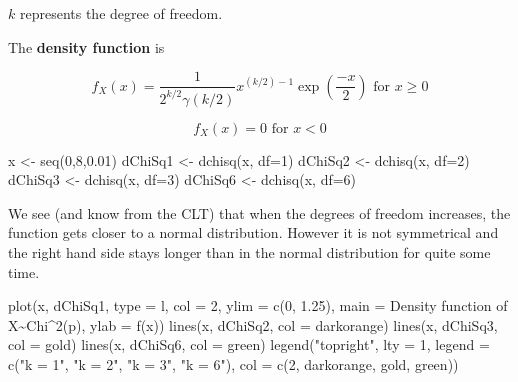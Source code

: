 \documentclass[
  letterpaper,
  DIV=11,
  numbers=noendperiod]{scrreprt}
\newenvironment{Shaded}{\begin{snugshade}}{\end{snugshade}}
\newcommand{\AttributeTok}[1]{\textcolor[rgb]{0.40,0.45,0.13}{#1}}
\newcommand{\DecValTok}[1]{\textcolor[rgb]{0.68,0.00,0.00}{#1}}
\newcommand{\FloatTok}[1]{\textcolor[rgb]{0.68,0.00,0.00}{#1}}
\newcommand{\FunctionTok}[1]{\textcolor[rgb]{0.28,0.35,0.67}{#1}}
\newcommand{\NormalTok}[1]{\textcolor[rgb]{0.00,0.23,0.31}{#1}}
\newcommand{\OtherTok}[1]{\textcolor[rgb]{0.00,0.23,0.31}{#1}}
\newcommand{\StringTok}[1]{\textcolor[rgb]{0.13,0.47,0.30}{#1}}
\begin{document}
\(k\) represents the degree of freedom.

The \textbf{density function} is

\[f_X(x) = \dfrac {1} {2^{k/2} \gamma(k/2)} x^{(k/2)-1} \exp{(\dfrac{-x}{2})} \text{ for } x \geq 0\]

\[f_X(x) = 0 \text{ for } x < 0\]

\begin{Shaded}
\begin{Highlighting}[]
\NormalTok{x }\OtherTok{\textless{}{-}} \FunctionTok{seq}\NormalTok{(}\DecValTok{0}\NormalTok{,}\DecValTok{8}\NormalTok{,}\FloatTok{0.01}\NormalTok{)}
\NormalTok{dChiSq1 }\OtherTok{\textless{}{-}} \FunctionTok{dchisq}\NormalTok{(x, }\AttributeTok{df=}\DecValTok{1}\NormalTok{)}
\NormalTok{dChiSq2 }\OtherTok{\textless{}{-}} \FunctionTok{dchisq}\NormalTok{(x, }\AttributeTok{df=}\DecValTok{2}\NormalTok{)}
\NormalTok{dChiSq3 }\OtherTok{\textless{}{-}} \FunctionTok{dchisq}\NormalTok{(x, }\AttributeTok{df=}\DecValTok{3}\NormalTok{)}
\NormalTok{dChiSq6 }\OtherTok{\textless{}{-}} \FunctionTok{dchisq}\NormalTok{(x, }\AttributeTok{df=}\DecValTok{6}\NormalTok{)}
\end{Highlighting}
\end{Shaded}

We see (and know from the CLT) that when the degrees of freedom
increases, the function gets closer to a normal distribution. However it
is not symmetrical and the right hand side stays longer than in the
normal distribution for quite some time.

\begin{Shaded}
\begin{Highlighting}[]
\FunctionTok{plot}\NormalTok{(x, dChiSq1, }\AttributeTok{type =} \StringTok{\textquotesingle{}l\textquotesingle{}}\NormalTok{, }\AttributeTok{col =} \DecValTok{2}\NormalTok{, }\AttributeTok{ylim =} \FunctionTok{c}\NormalTok{(}\DecValTok{0}\NormalTok{, }\FloatTok{1.25}\NormalTok{),}
     \AttributeTok{main =} \StringTok{\textquotesingle{}Density function of X\textasciitilde{}Chi\^{}2(p)\textquotesingle{}}\NormalTok{, }\AttributeTok{ylab =} \StringTok{\textquotesingle{}f(x)\textquotesingle{}}\NormalTok{)}
\FunctionTok{lines}\NormalTok{(x, dChiSq2, }\AttributeTok{col =} \StringTok{\textquotesingle{}darkorange\textquotesingle{}}\NormalTok{)}
\FunctionTok{lines}\NormalTok{(x, dChiSq3, }\AttributeTok{col =} \StringTok{\textquotesingle{}gold\textquotesingle{}}\NormalTok{)}
\FunctionTok{lines}\NormalTok{(x, dChiSq6, }\AttributeTok{col =} \StringTok{\textquotesingle{}green\textquotesingle{}}\NormalTok{)}
\FunctionTok{legend}\NormalTok{(}\StringTok{"topright"}\NormalTok{, }\AttributeTok{lty =} \DecValTok{1}\NormalTok{,}
       \AttributeTok{legend =} \FunctionTok{c}\NormalTok{(}\StringTok{"k = 1"}\NormalTok{, }\StringTok{"k = 2"}\NormalTok{, }\StringTok{"k = 3"}\NormalTok{, }\StringTok{"k = 6"}\NormalTok{),}
       \AttributeTok{col =} \FunctionTok{c}\NormalTok{(}\DecValTok{2}\NormalTok{, }\StringTok{\textquotesingle{}darkorange\textquotesingle{}}\NormalTok{, }\StringTok{\textquotesingle{}gold\textquotesingle{}}\NormalTok{, }\StringTok{\textquotesingle{}green\textquotesingle{}}\NormalTok{))}
\end{Highlighting}
\end{Shaded}
\end{document}
